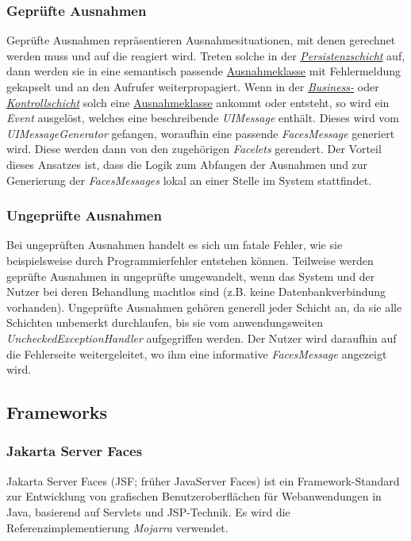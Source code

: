 \subsubsection{Geprüfte Ausnahmen}
Geprüfte Ausnahmen repräsentieren Ausnahmesituationen, mit
denen gerechnet werden muss und auf die reagiert wird.
Treten solche in der \emph{\hyperref[arch:persistence]{Persistenzschicht}}
auf, dann werden sie in eine semantisch passende \hyperref[arch:busex]{Ausnahmeklasse}
mit Fehlermeldung gekapselt und an den Aufrufer weiterpropagiert.
Wenn in der \emph{\hyperref[arch:bus]{Business-}} oder
\emph{\hyperref[arch:control]{Kontrollschicht}} solch eine
\hyperref[arch:busex]{Ausnahmeklasse} ankommt oder entsteht, so
wird ein \emph{Event} ausgelöst, welches eine beschreibende \emph{UIMessage} enthält.
Dieses wird vom \emph{UIMessageGenerator} gefangen, woraufhin eine passende
\emph{FacesMessage} generiert wird.
Diese werden dann von den zugehörigen \emph{Facelets} %
gerendert.
Der Vorteil dieses Ansatzes ist, dass die Logik
zum Abfangen der Ausnahmen und zur Generierung der
\emph{FacesMessages} lokal an einer Stelle im System stattfindet.

\subsubsection{Ungeprüfte Ausnahmen}
Bei ungeprüften Ausnahmen handelt es sich um fatale Fehler, wie sie beispielsweise durch
Programmierfehler entstehen können. Teilweise werden geprüfte Ausnahmen
in ungeprüfte umgewandelt, wenn das System und der Nutzer bei deren Behandlung
machtlos sind (z.B. keine Datenbankverbindung vorhanden). %
Ungeprüfte Ausnahmen gehören generell jeder Schicht an, da sie alle Schichten unbemerkt durchlaufen,
bis sie vom anwendungsweiten
\emph{UncheckedExceptionHandler} %
aufgegriffen werden. Der Nutzer wird daraufhin auf die Fehlerseite %
weitergeleitet, wo ihm eine informative \emph{FacesMessage} angezeigt wird.

\subsection{Frameworks}\label{arch:frameworks}

\subsubsection{Jakarta Server Faces}
Jakarta Server Faces (JSF; früher JavaServer Faces) ist ein Framework-Standard zur
Entwicklung von grafischen Benutzeroberflächen für Webanwendungen in Java, basierend auf Servlets und JSP-Technik.
Es wird die Referenzimplementierung \emph{Mojarra} verwendet.

